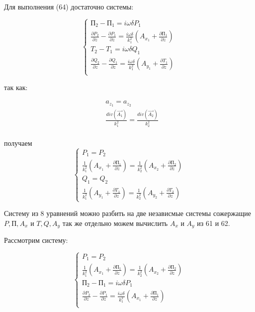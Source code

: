 	Для выполнения (64) достаточно системы:
	
	\begin{equation}
		\begin{cases}
			\text{П}_2 - \text{П}_1 = i \omega \delta P_1 \\
			\frac{\partial P_2}{\partial z} - \frac{\partial P_1}{\partial z} = \frac{i \omega \delta}{k_1^2} (A_{x_1} + \frac{\partial \text{П}_1}{\partial z}) \\
			T_2 - T_1 = i \omega \delta Q_1 \\
			\frac{\partial Q_2}{\partial z} - \frac{\partial Q_1}{\partial z} = \frac{i \omega \delta}{k_1^2} (A_{y_1} + \frac{\partial T_1}{\partial z}) \\
		\end{cases}
	\end{equation}
	
	\newpage
	
	так как:
	
	\begin{equation*}
		\begin{aligned}
			&a_{z_1} = a_{z_2} \\ 
			&\frac{div(\vec{A_1})}{k_1^2} = \frac{div(\vec{A_2})}{k_2^2} \\
		\end{aligned}
	\end{equation*}
	
	получаем 
	\begin{equation}
		
		\begin{cases}
			P_1 = P_2 \\
			\frac{1}{k_1^2}(A_{x_1} + \frac{\partial \text{П}_1}{\partial z}) = \frac{1}{k_2^2}(A_{x_2} + \frac{\partial \text{П}_2}{\partial z}) \\
			Q_1 = Q_2 \\
			\frac{1}{k_1^2}(A_{y_1} + \frac{\partial T_1}{\partial z}) = \frac{1}{k_2^2}(A_{y_2} + \frac{\partial T_2}{\partial z})
		\end{cases}
	\end{equation}
	
	Систему из 8 уравнений можно разбить на две независмые системы сожержащие $P, \text{П}, A_x$ и $T, Q, A_y$
	так же отдельно можем вычислить $A_x$ и $A_y$ из 61 и 62.
	
	Рассмотрим систему:
	
	\begin{equation}
		\begin{cases}
			P_1 = P_2 \\
			\frac{1}{k_1^2}(A_{x_1} + \frac{\partial \text{П}_1}{\partial z}) = \frac{1}{k_2^2}(A_{x_2} + \frac{\partial \text{П}_2}{\partial z}) \\
			\text{П}_2 - \text{П}_1 = i \omega \delta P_1 \\
			\frac{\partial P_2}{\partial z} - \frac{\partial P_1}{\partial z} = \frac{i \omega \delta}{k_1^2} (A_{x_1} + \frac{\partial \text{П}_1}{\partial z}) \\
		\end{cases}
	\end{equation}
	
